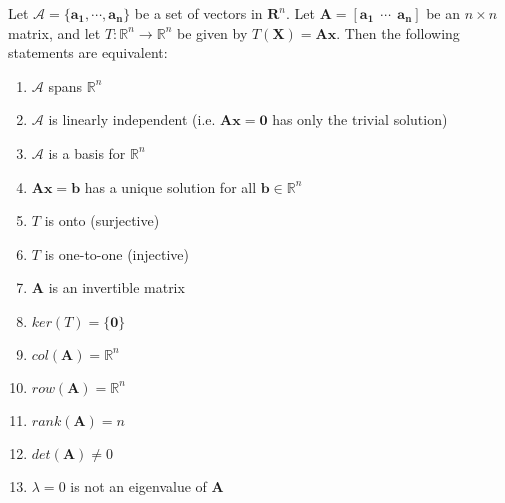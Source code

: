 \begin{theorem}
Let $\mathcal{A}=\{\bm{a_1},\cdots,\bm{a_n}\}$ be a set of vectors in $\bm{R}^n$. Let $\bm{A} = [\bm{a_1}\ \ \cdots\ \ \bm{a_n}]$ be an $n\times n$ matrix, and let $T:\mathbb{R}^n\rightarrow\mathbb{R}^n$ be given by $T(\bm{X})=\bm{Ax}$. Then the following statements are equivalent:
    \begin{enumerate}[label=\alph*)]
        \item $\mathcal{A}$ spans $\mathbb{R}^n$
        \item $\mathcal{A}$ is linearly independent (i.e. $\bm{Ax}=\bm{0}$ has only the trivial solution)
        \item $\mathcal{A}$ is a basis for $\mathbb{R}^n$
        \item $\bm{Ax}=\bm{b}$ has a unique solution for all $\bm{b}\in\mathbb{R}^n$
        \item $T$ is onto (surjective)
        \item $T$ is one-to-one (injective)
        \item $\bm{A}$ is an invertible matrix
        \item $ker(T)=\{\bm{0}\}$
        \item $col(\bm{A})=\mathbb{R}^n$
        \item $row(\bm{A})=\mathbb{R}^n$
        \item $rank(\bm{A})=n$
        \item $det(\bm{A})\neq 0$
        \item $\lambda=0$ is not an eigenvalue of $\bm{A}$
    \end{enumerate}
\end{theorem}
